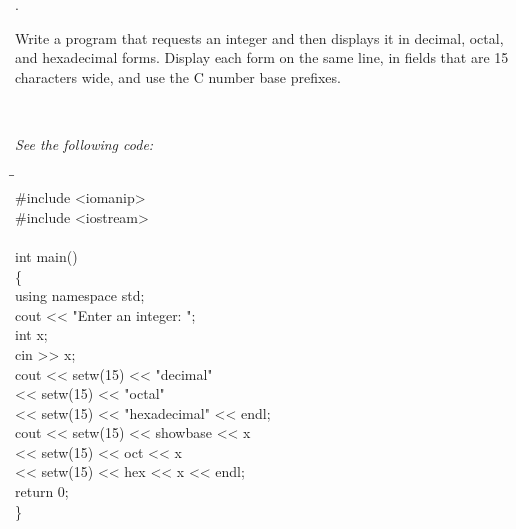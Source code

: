 \documentclass{amsart}
\begin{document}
\phantom{\quad} 
\vfill
{}. 
\begin{minipage}[t]{11.5 cm}
	Write a program that requests an integer and then displays it in decimal, octal, and hexadecimal forms. Display each form on the same line, in fields that are 15 characters wide, and use the C\raisebox{.15ex}{++} number base prefixes. 
\end{minipage} \\[1ex]
\phantom{3. } 
\begin{minipage}[t]{11.5 cm}
	{\slshape See the following code:}
	{\ttfamily
		\begin{tabbing}
			\phantom{\qquad}\=\phantom{\qquad}\=\phantom{\qquad}\= \\
			\#include <iomanip> \\
			\#include <iostream> \\
			\\
			int main() \\
			\{
			\+ \\
				using namespace std; \\
				cout << "Enter an integer: "; \\
				int x; \\
				cin >> x; \\
				cout << setw(15) << "decimal" \\
				\phantom{cout }<< setw(15) << "octal" \\
				\phantom{cout }<< setw(15) << "hexadecimal" << endl; \\
				cout << setw(15) << showbase << x \\
				\phantom{cout }<< setw(15) << oct << x \\
				\phantom{cout }<< setw(15) << hex << x << endl; \\
				return 0; \\
			\< \}
		\end{tabbing}
	}
\end{minipage} 
\vfill
\newpage
\end{document}
